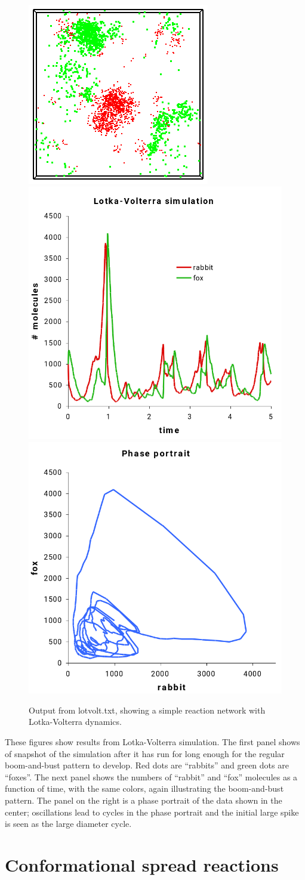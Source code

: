 \documentclass {scrbook}
\begin{document}
\begin{figure}[h]
\centering
\includegraphics[height=5 cm]{figures/image53.png}
\includegraphics[height=5 cm]{figures/image54.png}
\includegraphics[height=5 cm]{figures/image55.png}
\caption{Output from lotvolt.txt, showing a simple reaction network with Lotka-Volterra dynamics.}
\label{fig:lotvolt}
\end{figure}

These figures show results from Lotka-Volterra simulation. The first panel shows of snapshot of the simulation after it has run for long enough for the regular boom-and-bust pattern to develop. Red dots are ``rabbits'' and green dots are ``foxes''. The next panel shows the numbers of ``rabbit'' and ``fox'' molecules as a function of time, with the same colors, again illustrating the boom-and-bust pattern. The panel on the right is a phase portrait of the data shown in the center; oscillations lead to cycles in the phase portrait and the initial large spike is seen as the large diameter cycle.

\section{Conformational spread reactions}
\end{document}
